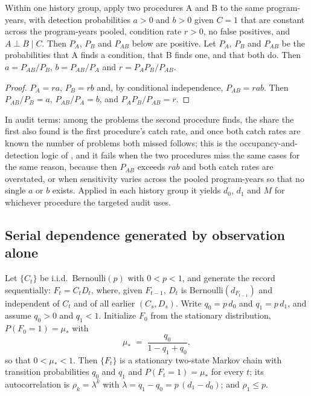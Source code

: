 \begin{proposition}\label{prop:twoproc}
Within one history group, apply two procedures A and B to the same
program-years, with detection probabilities $a > 0$ and $b > 0$ given $C =
1$ that are constant across the program-years pooled, condition rate $r > 0$,
no false positives, and $A \perp B \mid C$. Then $P_A$, $P_B$ and $P_{AB}$
below are positive. Let $P_A$, $P_B$ and $P_{AB}$ be the
probabilities that A finds a condition, that B finds one, and that both do.
Then $a = P_{AB}/P_B$, $b = P_{AB}/P_A$ and $r = P_A P_B / P_{AB}$.
\end{proposition}

\begin{proof}
$P_A = r a$, $P_B = r b$ and, by conditional independence, $P_{AB} = r a b$.
Then $P_{AB}/P_B = a$, $P_{AB}/P_A = b$, and $P_A P_B / P_{AB} = r$.
\end{proof}

In audit terms: among the problems the second procedure finds, the share the
first also found is the first procedure's catch rate, and once both catch
rates are known the number of problems both missed follows; this is the
occupancy-and-detection logic of \citet{mackenzie2002}, and it fails when the
two procedures miss the same cases for the same reason, because then $P_{AB}$
exceeds $r a b$ and both catch rates are overstated, or when sensitivity
varies across the pooled program-years so that no single $a$ or $b$ exists. Applied in each history
group it yields $d_0$, $d_1$ and $M$ for whichever procedure the targeted
audit uses.

\subsection{Serial dependence generated by observation alone}

\begin{proposition}\label{prop:markov}
Let $\{C_t\}$ be i.i.d.\ Bernoulli$(p)$ with $0 < p < 1$, and generate the
record sequentially: $F_t = C_t D_t$, where, given $F_{t-1}$, $D_t$ is
Bernoulli$(d_{F_{t-1}})$ and independent of $C_t$ and of all earlier
$(C_s, D_s)$. Write $q_0 = p\,d_0$ and $q_1 = p\,d_1$, and assume $q_0 > 0$
and $q_1 < 1$. Initialize $F_0$ from the stationary distribution,
$P(F_0 = 1) = \mu_*$ with
%
\[
  \mu_* \;=\; \frac{q_0}{1 - q_1 + q_0} ,
\]
%
so that $0 < \mu_* < 1$. Then $\{F_t\}$ is a stationary two-state Markov chain
with transition probabilities $q_0$ and $q_1$ and $P(F_t = 1) = \mu_*$ for
every $t$; its autocorrelation is $\rho_k = \lambda^k$ with $\lambda = q_1 -
q_0 = p\,(d_1 - d_0)$; and $\rho_1 \leq p$.
\end{proposition}

